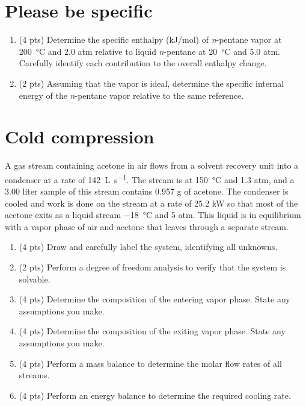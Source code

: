 \documentclass[11pt]{article}
\begin{document}
\section{Please be specific}
\label{sec-3}
\begin{enumerate}
\item (4 pts) Determine the specific enthalpy (kJ/mol) of \emph{n}-pentane vapor at \SI{200}{\celsius} and 2.0 atm relative to liquid \emph{n}-pentane at \SI{20}{\celsius} and 5.0 atm.  Carefully identify each contribution to the overall enthalpy change.
\item (2 pts) Assuming that the vapor is ideal, determine the specific internal energy of the \emph{n}-pentane vapor relative to the same reference.
\end{enumerate}

\section{Cold compression}
\label{sec-4}
A gas stream containing acetone in air flows from a solvent recovery unit into a condenser at a rate of \SI{142}{\liter\per\second}.  The stream  is at \SI{150}{\celsius} and 1.3 atm, and a 3.00 liter sample of this stream contains 0.957 g of acetone. The condenser is cooled and work is done on the stream at a rate of 25.2 kW so that most of the acetone exits as  a liquid stream  \SI{-18}{\celsius} and 5 atm.  This liquid is in equilibrium with a vapor phase of air and acetone that leaves through a separate stream.

\begin{enumerate}
\item (4 pts) Draw and carefully label the system, identifying all unknowns.
\item (2 pts) Perform a degree of freedom analysis to verify that the system is solvable.
\item (4 pts) Determine the composition of the entering vapor phase.  State any assumptions you make.
\item (4 pts) Determine the composition of the exiting vapor phase.  State any assumptions you make.
\item (4 pts) Perform a mass balance to determine the molar flow rates of all streams.
\item (4 pts) Perform an energy balance to determine the required cooling rate.
\end{enumerate}
\end{document}
